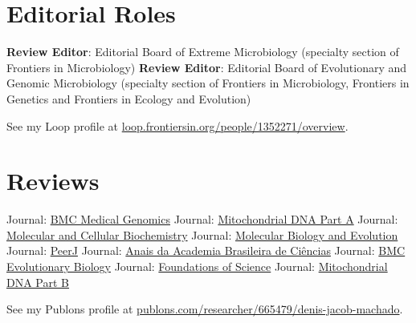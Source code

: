 
\section{Editorial Roles}

	    {\textbf{Review Editor}: Editorial Board of Extreme Microbiology (specialty section of Frontiers in Microbiology)}
	\cvline{---}
	    {\textbf{Review Editor}: Editorial Board of Evolutionary and Genomic Microbiology (specialty section of Frontiers in Microbiology, Frontiers in Genetics and Frontiers in Ecology and Evolution)}

\vspace{0.5em}

See my Loop profile at  \href{https://loop.frontiersin.org/people/1352271/overview}{loop.frontiersin.org/people/1352271/overview}.

\section{Reviews}

	    {Journal: \href{https://bmcmedgenomics.biomedcentral.com/?gclid=CjwKCAjwrPCGBhALEiwAUl9X02eq5n6VLJ16fWlJrdFIVyGvqligO-_5N1em5soDXeFFqL7AyHJ6CxoCCX4QAvD_BwE}{BMC Medical Genomics}}
		{Journal: \href{https://www.tandfonline.com/loi/imdn20}{Mitochondrial DNA Part A}}
	\cvline{---}
	    {Journal: \href{https://www.springer.com/journal/11010/?gclid=Cj0KCQjwoJX8BRCZARIsAEWBFMLKBYnPcerYvwBvi0o_0fPoNuCnGz_5XU9lYKC91oSA7LozsZKev0saAuNLEALw_wcB}{Molecular and Cellular Biochemistry}}
	\cvline{---}
		{Journal: \href{https://academic.oup.com/mbe}{Molecular Biology and Evolution}}
	\cvline{---}
		{Journal: \href{https://peerj.com/}{PeerJ}}
	    {Journal: \href{https://www.scielo.br/scielo.php?script=sci_serial&pid=0001-3765&lng=en&nrm=iso}{Anais da Academia Brasileira de Ciências}}
	\cvline{---}
		{Journal: \href{https://bmcevolbiol.biomedcentral.com/}{BMC Evolutionary Biology}}
	\cvline{---}
		{Journal: \href{https://www.springer.com/journal/10699}{Foundations of Science}}
	\cvline{---}
		{Journal: \href{https://www.tandfonline.com/toc/tmdn20/current}{Mitochondrial DNA Part B}}

\vspace{0.5em}

See my Publons profile at  \href{https://publons.com/researcher/665479/denis-jacob-machado/}{publons.com/researcher/665479/denis-jacob-machado}.
